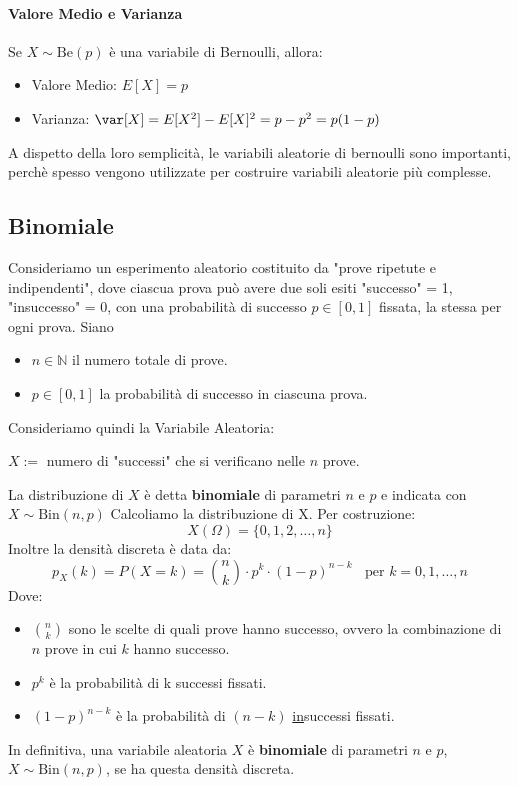 \paragraph{Valore Medio e Varianza}
Se $X \sim \text{Be}(p)$ è una variabile di Bernoulli, allora:
\begin{itemize}
	\item Valore Medio: $E[X] = p$
	\item Varianza: $\var[X] = E[X^2] - E[X]^2 = p-p^2 = p(1-p)$
\end{itemize}
A dispetto della loro semplicità, le variabili aleatorie di bernoulli sono importanti, perchè spesso
vengono utilizzate per costruire variabili aleatorie più complesse.

\subsection{Binomiale}
Consideriamo un esperimento aleatorio costituito da "prove ripetute e indipendenti",
dove ciascua prova può avere due soli esiti "successo" = 1, "insuccesso" = 0, con una
probabilità di successo $p \in [0,1]$ fissata, la stessa per ogni prova.
Siano \begin{itemize}
	\item $n \in \mathbb{N}$ il numero totale di prove.
	\item $p \in [0,1]$ la probabilità di successo in ciascuna prova.
\end{itemize}
Consideriamo quindi la Variabile Aleatoria:
\begin{center}
	$X:=$ numero di "successi" che si verificano nelle $n$ prove.
\end{center}
La distribuzione di $X$ è detta \textbf{binomiale} di parametri $n$ e $p$ e indicata con $X \sim \text{Bin}(n,p)$
Calcoliamo la distribuzione di X. Per costruzione:
\[
	X(\Omega) = \{0,1,2,\dots,n\}
\]
Inoltre la densità discreta è data da:
\begin{equation*}
	p_X (k) = P(X=k) = \binom{n}{k} \cdot p^k \cdot (1-p)^{n-k} \;\;\text{ per } k = 0,1,\dots, n
\end{equation*}
Dove: \begin{itemize}
	\item $\binom{n}{k}$ sono le scelte di quali prove hanno successo,
	      ovvero la combinazione di $n$ prove in cui $k$ hanno successo.
	\item $p^k$ è la probabilità di k successi fissati.
	\item $(1-p)^{n-k}$ è la probabilità di $(n-k)$ \underline{in}successi fissati.
\end{itemize}
In definitiva, una variabile aleatoria $X$ è \textbf{binomiale} di parametri $n$ e $p$, $X \sim \text{Bin}(n,p)$,
se ha questa densità discreta.

